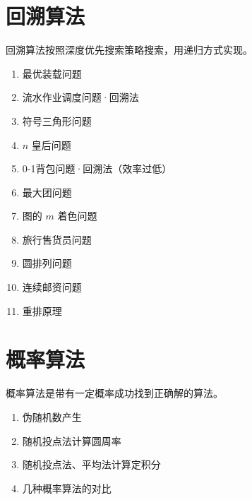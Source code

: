 \documentclass[UTF8]{ctexart}
\newcommand\Emph[1]{\textcolor{cyan!80!black}{#1}}
\begin{document}
\section{回溯算法}
\begin{summary}
回溯算法按照深度优先搜索策略搜索，用递归方式实现。
\begin{enumerate}[itemsep=0pt,parsep=0pt]
  \item \Emph{最优装载问题}
  \item 流水作业调度问题·回溯法
  \item 符号三角形问题
  \item $n$ 皇后问题
  \item \Emph{0-1背包问题·回溯法}（效率过低）
  \item 最大团问题
  \item 图的 $m$ 着色问题
  \item 旅行售货员问题
  \item 圆排列问题
  \item 连续邮资问题
  \item 重排原理
\end{enumerate}
\end{summary}

\section{概率算法}

\begin{summary}
概率算法是带有一定概率成功找到正确解的算法。
\begin{enumerate}[itemsep=0pt,parsep=0pt]
  \item 伪随机数产生
  \item 随机投点法计算圆周率
  \item 随机投点法、平均法计算定积分
  \item 几种概率算法的对比
\end{enumerate}

\end{summary}

\BgThispage
\end{document}
